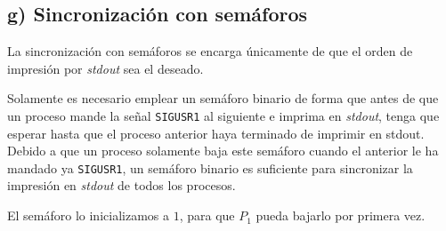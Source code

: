 \documentclass{article}
\begin{document}
\subsection*{g) Sincronización con semáforos}

La sincronización con semáforos se encarga únicamente de que el orden de impresión por \textit{stdout} sea el deseado.

Solamente es necesario emplear un semáforo binario de forma que antes de que un proceso mande la señal \texttt{SIGUSR1} al siguiente e imprima en \textit{stdout}, tenga que esperar hasta que el proceso anterior haya terminado de imprimir en stdout. Debido a que un proceso solamente baja este semáforo cuando el anterior le ha mandado ya \texttt{SIGUSR1}, un semáforo binario es suficiente para sincronizar la impresión en  \textit{stdout} de todos los procesos.

El semáforo lo inicializamos a $1$, para que $P_1$ pueda bajarlo por primera vez.
\end{document}
